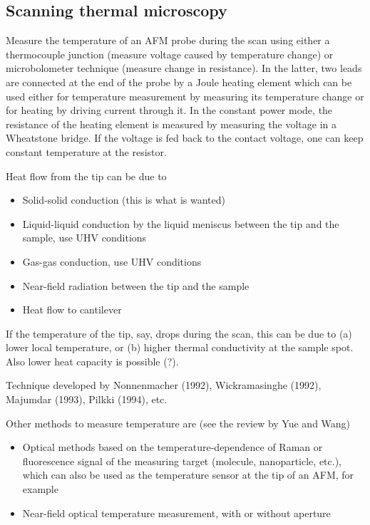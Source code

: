 \subsection{Scanning thermal microscopy}

Measure the temperature of an AFM probe during the scan using either a thermocouple junction (measure voltage caused by temperature change) or microbolometer technique (measure change in resistance). In the latter, two leads are connected at the end of the probe by a Joule heating element which can be used either for temperature measurement by measuring its temperature change or for heating by driving current through it. In the constant power mode, the resistance of the heating element is measured by measuring the voltage in a Wheatstone bridge. If the voltage is fed back to the contact voltage, one can keep constant temperature at the resistor. 

Heat flow from the tip can be due to
\begin{itemize}
 \item Solid-solid conduction (this is what is wanted)
 \item Liquid-liquid conduction by the liquid meniscus between the tip and the sample, use UHV conditions
 \item Gas-gas conduction, use UHV conditions
 \item Near-field radiation between the tip and the sample
 \item Heat flow to cantilever
\end{itemize}

If the temperature of the tip, say, drops during the scan, this can be due to (a) lower local temperature, or (b) higher thermal conductivity at the sample spot. Also lower heat capacity is possible (?). 

Technique developed by Nonnenmacher (1992), Wickramasinghe (1992), Majumdar (1993), Pilkki (1994), etc.

Other methods to measure temperature are (see the review by Yue and Wang)
\begin{itemize}
 \item Optical methods based on the temperature-dependence of Raman or fluorescence signal of the measuring target (molecule, nanoparticle, etc.), which can also be used as the temperature sensor at the tip of an AFM, for example
 \item Near-field optical temperature measurement, with or without aperture
\end{itemize}

